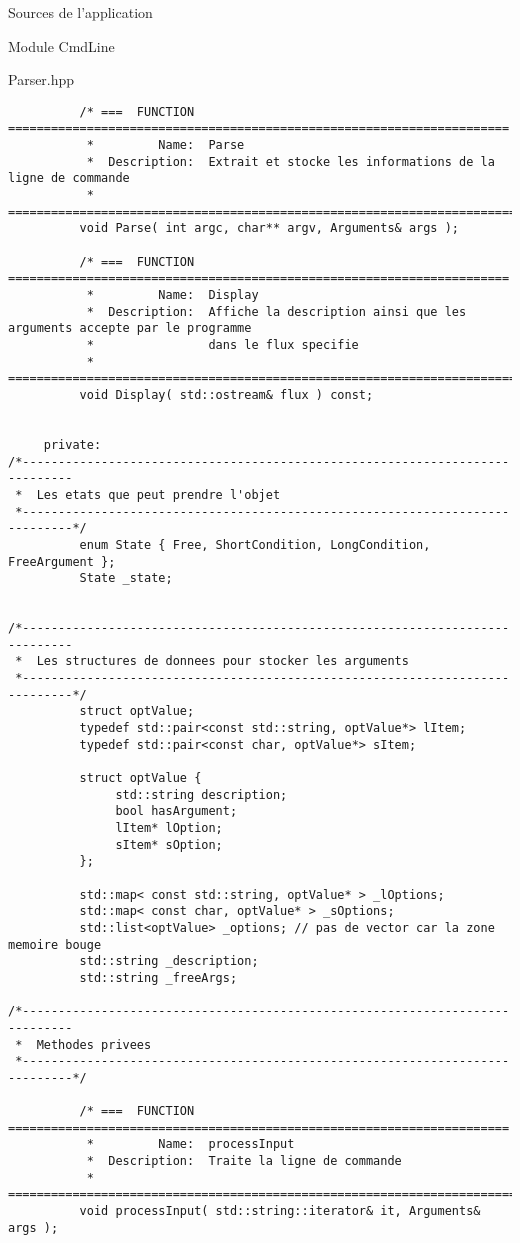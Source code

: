 \documentclass{article}
\begin{document}
\begin{section}{Sources de l'application}
\begin{subsection}{Module CmdLine}
\begin{paragraph}{Parser.hpp}
\begin{verbatim}
          /* ===  FUNCTION  ======================================================================
           *         Name:  Parse
           *  Description:  Extrait et stocke les informations de la ligne de commande
           * =====================================================================================*/
          void Parse( int argc, char** argv, Arguments& args );

          /* ===  FUNCTION  ======================================================================
           *         Name:  Display
           *  Description:  Affiche la description ainsi que les arguments accepte par le programme
           *                dans le flux specifie
           * =====================================================================================*/
          void Display( std::ostream& flux ) const;


     private:
/*-----------------------------------------------------------------------------
 *  Les etats que peut prendre l'objet
 *-----------------------------------------------------------------------------*/
          enum State { Free, ShortCondition, LongCondition, FreeArgument };
          State _state;

          
/*-----------------------------------------------------------------------------
 *  Les structures de donnees pour stocker les arguments
 *-----------------------------------------------------------------------------*/
          struct optValue;
          typedef std::pair<const std::string, optValue*> lItem;
          typedef std::pair<const char, optValue*> sItem;

          struct optValue {
               std::string description;
               bool hasArgument;
               lItem* lOption;
               sItem* sOption;
          };

          std::map< const std::string, optValue* > _lOptions;
          std::map< const char, optValue* > _sOptions;
          std::list<optValue> _options; // pas de vector car la zone memoire bouge
          std::string _description;
          std::string _freeArgs;

/*-----------------------------------------------------------------------------
 *  Methodes privees
 *-----------------------------------------------------------------------------*/

          /* ===  FUNCTION  ======================================================================
           *         Name:  processInput
           *  Description:  Traite la ligne de commande
           * =====================================================================================*/
          void processInput( std::string::iterator& it, Arguments& args );


\end{verbatim}
\end{paragraph}
\end{subsection}
\end{section}
\end{document}
